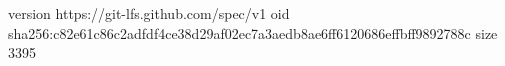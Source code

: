 version https://git-lfs.github.com/spec/v1
oid sha256:c82e61c86c2adfdf4ce38d29af02ec7a3aedb8ae6ff6120686effbff9892788c
size 3395
